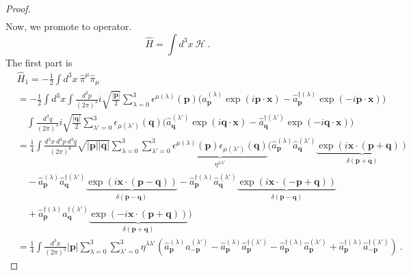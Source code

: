 \begin{proof}
\begin{equation*}
\begin{aligned}
        \end{aligned}
        \end{equation*}
        Now, we promote to operator. 
        \begin{equation*}
            \hat H = \int d^3 x ~ \mathcal H ~.
        \end{equation*}
        The first part is 
        \begin{equation*}
        \begin{aligned}
            & \hat H_1 = - \frac{1}{2} \int d^3 x ~ \hat \pi^\mu \hat \pi_\mu \\ & = - \frac{1}{2} \int d^3 x \int \frac{d^3 p}{(2\pi)^3} i \sqrt{\frac{|\mathbf p|}{2}} \sum_{\lambda=0}^{3} \epsilon^{\mu(\lambda)} (\mathbf p) \Big ( \hat a_{\mathbf p}^{(\lambda)}   \exp(i \mathbf p \cdot \mathbf x) - \hat a_{\mathbf p}^{\dagger (\lambda)}   \exp(- i \mathbf p \cdot \mathbf x) \Big) \\ & \quad \int \frac{d^3 q}{(2\pi)^3} i \sqrt{\frac{|\mathbf q|}{2}} \sum_{\lambda'=0}^{3} \epsilon_{\mu(\lambda')} (\mathbf q)  \Big ( \hat a_{\mathbf q}^{(\lambda')}   \exp(i \mathbf q \cdot \mathbf x) - \hat a_{\mathbf q}^{\dagger (\lambda')}   \exp(- i \mathbf q \cdot \mathbf x) \Big) \\ & = \frac{1}{4} \int \frac{d^3 x ~ d^3 p ~ d^3 q}{(2\pi)^6} \sqrt{|\mathbf p| |\mathbf q|} \sum_{\lambda=0}^{3} \sum_{\lambda'=0}^{3} \underbrace{\epsilon^{\mu(\lambda)} (\mathbf p) \epsilon_{\mu(\lambda')} (\mathbf q)}_{\eta^{\lambda \lambda'}} ( \hat a_{\mathbf p}^{(\lambda)}   \hat a_{\mathbf q}^{(\lambda')}   \underbrace{\exp(i  \mathbf x \cdot (\mathbf p + \mathbf q)) }_{\delta(\mathbf p + \mathbf q)}  \\ & \quad - \hat a_{\mathbf p}^{(\lambda)}  \hat a_{\mathbf q}^{\dagger (\lambda')}   \underbrace{\exp(i  \mathbf x \cdot (\mathbf p - \mathbf q)) }_{\delta(\mathbf p - \mathbf q)} - \hat a_{\mathbf p}^{\dagger (\lambda)}   \hat a_{\mathbf q}^{(\lambda')}   \underbrace{\exp(i  \mathbf x \cdot (- \mathbf p + \mathbf q)) }_{\delta(\mathbf p - \mathbf q)} \\ & \quad + \hat a_{\mathbf p}^{\dagger (\lambda)}   \hat a_{\mathbf q}^{\dagger (\lambda')}   \underbrace{\exp(- i  \mathbf x \cdot (\mathbf p + \mathbf q)) }_{\delta(\mathbf p + \mathbf q)} )
        \end{aligned}
        \end{equation*}
        \begin{equation*}
        \begin{aligned}
            & = \frac{1}{4} \int \frac{d^3 x}{(2\pi)^3} |\mathbf p| \sum_{\lambda=0}^{3} \sum_{\lambda'=0}^{3} \eta^{\lambda \lambda'} ( \hat a_{\mathbf p}^{(\lambda)} \hat a_{- \mathbf p}^{(\lambda')}  - \hat a_{\mathbf p}^{(\lambda)} \hat a_{\mathbf p}^{\dagger (\lambda')}  - \hat a_{\mathbf p}^{\dagger (\lambda)} \hat a_{\mathbf p}^{(\lambda')} + \hat a_{\mathbf p}^{\dagger (\lambda)} \hat a_{- \mathbf p}^{\dagger (\lambda')} ) ~.

\end{aligned}
\end{equation*}
\end{proof}
